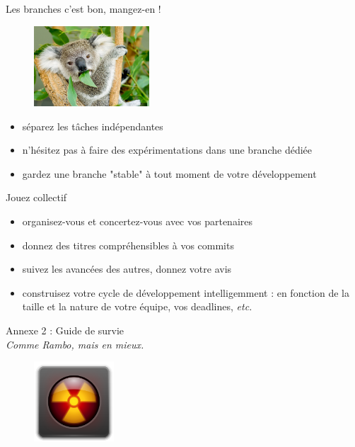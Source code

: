 \documentclass{beamer}
\begin{document}
\begin{frame}{Les branches c'est bon, mangez-en !}
	\begin{figure}
		\centering
		\includegraphics[height=3cm]{img/koala-eating-leaf}
	\end{figure}

	\begin{itemize}
		\item séparez les tâches indépendantes
		\item n'hésitez pas à faire des expérimentations dans une branche dédiée
		\item gardez une branche "stable" à tout moment de votre développement
	\end{itemize}
	
\end{frame}

\begin{frame}{Jouez collectif}

	\begin{itemize}
		\item organisez-vous et concertez-vous avec vos partenaires
		\item donnez des titres compréhensibles à vos commits
		\item suivez les avancées des autres, donnez votre avis
		\item construisez votre cycle de développement intelligemment : en fonction de la taille et la nature de votre équipe, vos deadlines, \textit{etc.}
	\end{itemize}
	
\end{frame}

\begin{frame}
		\begin{center}
 		\Large{Annexe 2 : Guide de survie}\\
 		{\small \textit{Comme Rambo, mais en mieux.}}
	\end{center}

	\begin{figure}
		\centering
		\includegraphics[height=3cm]{img/defcon}
	\end{figure}
\end{frame}
\end{document}
